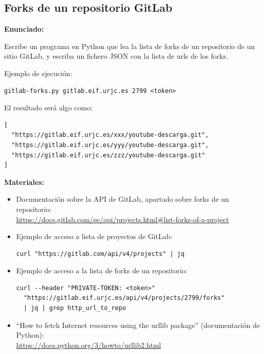\subsection{Forks de un repositorio GitLab}
\label{subsec:json-gitlab-forks}

\textbf{Enunciado:}

Escribe un programa en Python que lea la lista de forks de un repositorio de un sitio GitLab, y escriba un fichero JSON con la lista de urls de los forks.

Ejemplo de ejecución:

\begin{verbatim}
gitlab-forks.py gitlab.eif.urjc.es 2799 <token>
\end{verbatim}

El resultado será algo como:

\begin{verbatim}
[
  "https://gitlab.eif.urjc.es/xxx/youtube-descarga.git",
  "https://gitlab.eif.urjc.es/yyy/youtube-descarga.git",
  "https://gitlab.eif.urjc.es/zzz/youtube-descarga.git"
]
\end{verbatim}

\textbf{Materiales:}

\begin{itemize}
\item Documentación sobre la API de GitLab, apartado sobre forks de un repositorio: \\
\url{https://docs.gitlab.com/ee/api/projects.html#list-forks-of-a-project}

\item Ejemplo de acceso a lista de proyectos de GitLab:
  
\begin{verbatim}
curl "https://gitlab.com/api/v4/projects" | jq
\end{verbatim}

\item Ejemplo de acceso a la lista de forks de un repositorio:
  
\begin{verbatim}
curl --header "PRIVATE-TOKEN: <token>"
  "https://gitlab.eif.urjc.es/api/v4/projects/2799/forks"
  | jq | grep http_url_to_repo
\end{verbatim}

\item ``How to fetch Internet resources using the urllib package''
  (documentación de Python): \\
  \url{https://docs.python.org/3/howto/urllib2.html}
\end{itemize}

